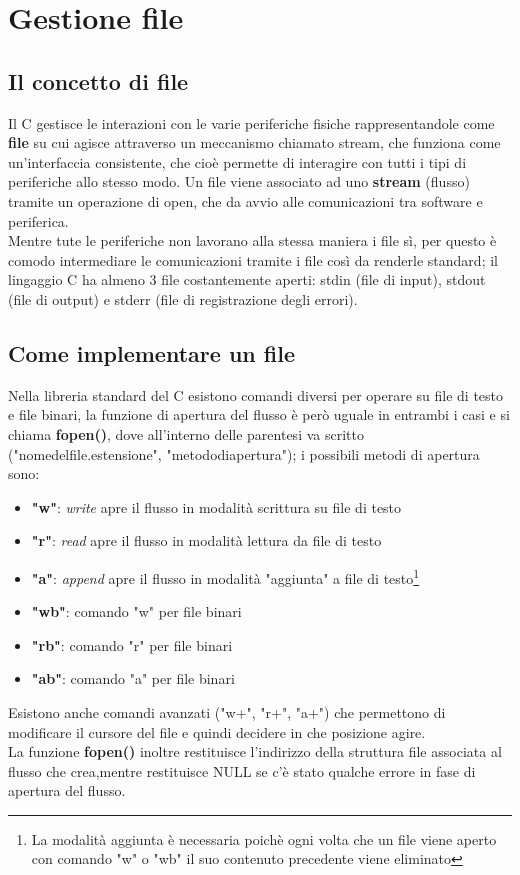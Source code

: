 \chapter{Gestione file}
\section{Il concetto di file}
Il C gestisce le interazioni con le varie periferiche fisiche rappresentandole come \textbf{file} su cui agisce attraverso un meccanismo chiamato stream, che funziona come un'interfaccia consistente, che cioè permette di interagire con tutti i tipi di periferiche allo stesso modo. Un file viene associato ad uno \textbf{stream} (flusso) tramite un operazione di open, che da avvio alle comunicazioni tra software e periferica.\\ Mentre tute le periferiche non lavorano alla stessa maniera i file sì, per questo è comodo intermediare le comunicazioni tramite i file così da renderle standard; il lingaggio C ha almeno 3 file costantemente aperti: stdin (file di input), stdout (file di output) e stderr (file di registrazione degli errori).\\
\section{Come implementare un file}
Nella libreria standard del C esistono comandi diversi per operare su file di testo e file binari, la funzione di apertura del flusso è però uguale in entrambi i casi e si chiama \textbf{fopen()}, dove all'interno delle parentesi va scritto ("nomedelfile.estensione", "metododiapertura"); i possibili metodi di apertura sono:
\begin{itemize}
	\item \textbf{"w"}: \textit{write} apre il flusso in modalità scrittura su file di testo
	\item \textbf{"r"}: \textit{read} apre il flusso in modalità lettura da file di testo
	\item \textbf{"a"}: \textit{append}  apre il flusso in modalità "aggiunta" a file di testo\footnote[1]{La modalità aggiunta è necessaria poichè ogni volta che un file viene aperto con comando "w" o "wb" il suo contenuto precedente viene eliminato}
	\item \textbf{"wb"}: comando "w" per file binari
	\item \textbf{"rb"}: comando "r" per file binari
	\item \textbf{"ab"}: comando "a" per file binari
\end{itemize}
Esistono anche comandi avanzati ("w+", "r+", "a+") che permettono di modificare il cursore del file e quindi decidere in che posizione agire.\\
La funzione \textbf{fopen()} inoltre restituisce l'indirizzo della struttura file associata al flusso che crea,mentre restituisce NULL se c'è stato qualche errore in fase di apertura del flusso.
